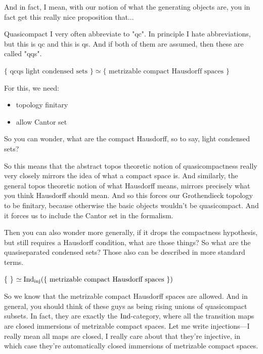 And in fact, I mean, with our notion of what the generating objects are, you in fact get this really nice proposition that... 

\begin{remark}
Quasicompact I very often abbreviate to "qc". In principle I hate abbreviations, but this is qc and this is qs. And if both of them are assumed, then these are called "qqs".
\end{remark}

\begin{proposition} \label{prop:3-lightcondset-hausdorff}

$\{ \text{ qcqs light condensed sets } \} \simeq \{ \text{ metrizable compact Hausdorff spaces } \}$

For this, we need:
\begin{itemize} 
\item topology finitary
\item allow Cantor set
\end{itemize} 

\end{proposition}


So you can wonder, what are the compact Hausdorff, so to say, light condensed sets?

So this means that the abstract topos theoretic notion of quasicompactness really very closely mirrors the idea of what a compact space is. 
And similarly, the general topos theoretic notion of what Hausdorff means, mirrors precisely what you think Hausdorff should mean. And so this forces our Grothendieck topology to be finitary, because otherwise the basic objects wouldn't be quasicompact. And it forces us to include the Cantor set in the formalism.

Then you can also wonder more generally, if it drops the compactness hypothesis, but still requires a Hausdorff condition, what are those things? So what are the quasiseparated condensed sets? Those also can be described in more standard terms.

\begin{proposition}
\{  \} $ \simeq \mathrm{Ind}_{\text{inj}} ( \{ \text{ metrizable compact Hausdorff spaces } \} ) $
\end{proposition}

So we know that the metrizable compact Hausdorff spaces are allowed. And in general, you should think of these guys as being rising unions of quasicompact subsets. In fact, they are exactly the $\mathrm{Ind}$-category, where all the transition maps are closed immersions of metrizable compact spaces. Let me write injections---I really mean all maps are closed, I really care about that they're injective, in which case they're automatically closed immersions of metrizable compact spaces. 

